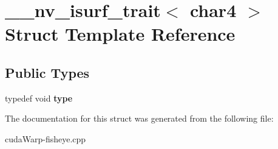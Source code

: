\hypertarget{struct____nv__isurf__trait_3_01char4_01_4}{}\section{\+\_\+\+\_\+nv\+\_\+isurf\+\_\+trait$<$ char4 $>$ Struct Template Reference}
\label{struct____nv__isurf__trait_3_01char4_01_4}
\subsection*{Public Types}
\begin{DoxyCompactItemize}
\item 
typedef void {\bfseries type}\hypertarget{struct____nv__isurf__trait_3_01char4_01_4_aad066b7637835f2d991b0832d5eef189}{}\label{struct____nv__isurf__trait_3_01char4_01_4_aad066b7637835f2d991b0832d5eef189}

\end{DoxyCompactItemize}


The documentation for this struct was generated from the following file\+:\begin{DoxyCompactItemize}
\item 
cuda\+Warp-\/fisheye.\+cpp\end{DoxyCompactItemize}
